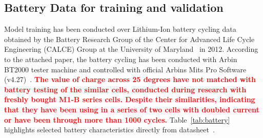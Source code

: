 \subsection{Battery Data for training and validation} \label{subsec:b_data}
Model training has been conducted over Lithium-Ion battery cycling data obtained by the Battery Research Group of the Center for Advanced Life Cycle Engineering (CALCE) Group at the University of Maryland~\cite{noauthor_calce_2017} in 2012.
According to the attached paper, the battery cycling has been conducted with Arbin BT2000 tester machine and controlled with official Arbins Mits Pro Software (v4.27)~\cite{xing_state_2014}.
\textcolor{red}{\textbf{The value of charge across 25 degrees have not matched with battery testing of the similar cells, conducted during research with freshly bought M1-B series cells.
Despite their similarities, indicating that they have been using in a series of two cells with doubled current or have been through more than 1000 cycles.}}
\mbox{Table~\ref{tab:battery}} highlights selected battery characteristics directly from datasheet~\cite{noauthor_anr26650m1a}.
\begin{table}[ht]
    \renewcommand{\arraystretch}{1.3}
    \caption{Battery characteristics}
    \centering
    \label{tab:battery}
\end{table}


